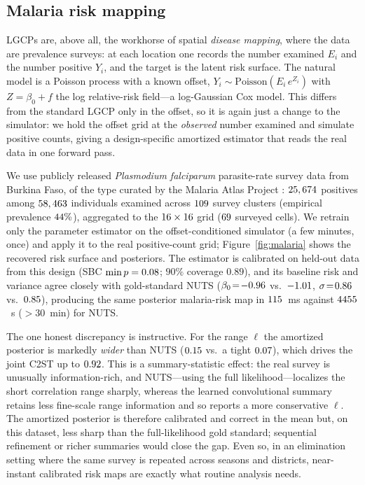 \documentclass[11pt]{article}
\newcommand{\Pois}{\mathrm{Poisson}}
\begin{document}
\subsection{Malaria risk mapping}
\label{sec:malaria}

LGCPs are, above all, the workhorse of spatial \emph{disease mapping}, where the
data are prevalence surveys: at each location one records the number examined
$E_i$ and the number positive $Y_i$, and the target is the latent risk surface.
The natural model is a Poisson process with a known offset,
$Y_i \sim \Pois(E_i\,e^{Z_i})$ with $Z=\beta_0+f$ the log relative-risk field---a
log-Gaussian Cox model. This differs from the standard LGCP only in the offset,
so it is again just a change to the simulator: we hold the offset grid at the
\emph{observed} number examined and simulate positive counts, giving a
design-specific amortized estimator that reads the real data in one forward pass.

We use publicly released \emph{Plasmodium falciparum} parasite-rate survey data
from Burkina Faso, of the type curated by the Malaria Atlas Project
\citep{pfeffer2018malariaatlas}: $25,674$ positives among $58,463$
individuals examined across $109$ survey clusters (empirical prevalence
$44\%$), aggregated to the $16\times16$ grid ($69$ surveyed
cells). We retrain only the parameter estimator on the offset-conditioned
simulator (a few minutes, once) and apply it to the real positive-count grid;
Figure~\ref{fig:malaria} shows the recovered risk surface and posteriors. The
estimator is calibrated on held-out data from this design (SBC $\min p=0.08$;
$90\%$ coverage $0.89$), and its baseline risk and variance agree closely with
gold-standard NUTS ($\beta_0\!=\!-0.96$ vs.\ $-1.01$,
$\sigma\!=\!0.86$ vs.\ $0.85$), producing the same posterior malaria-risk
map in $115$~ms against $4455$~s ($>\!\!30$~min) for NUTS.

The one honest discrepancy is instructive. For the range $\ell$ the amortized
posterior is markedly \emph{wider} than NUTS ($0.15$ vs.\ a tight $0.07$),
which drives the joint C2ST up to $0.92$. This is a summary-statistic effect:
the real survey is unusually information-rich, and NUTS---using the full
likelihood---localizes the short correlation range sharply, whereas the learned
convolutional summary retains less fine-scale range information and so reports a
more conservative $\ell$. The amortized posterior is therefore calibrated and
correct in the mean but, on this dataset, less sharp than the full-likelihood
gold standard; sequential refinement or richer summaries would close the gap.
Even so, in an elimination setting where the same survey is repeated across
seasons and districts, near-instant calibrated risk maps are exactly what routine
analysis needs.
\end{document}
